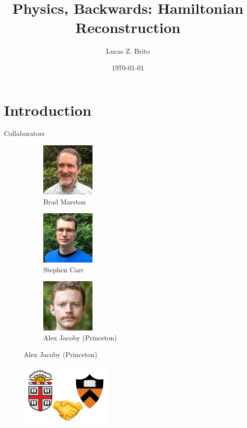 \documentclass{beamer}
\title{Physics, Backwards: Hamiltonian Reconstruction}
\author{Lucas Z. Brito}
\date{\today}
\institute{Brown Physics DUG Scialogue}
\begin{document}
\begin{frame}[plain]
    \titlepage 
\end{frame}

\section{Introduction}
\begin{frame}{Collaborators}
\begin{figure}[t]
\captionsetup[subfigure]{labelformat=empty}
\centering
\begin{subfigure}{0.33\textwidth}
	\centering
	\includegraphics[width=75pt]{figs/marston.jpg}
	\caption{Brad Marston}
\end{subfigure}%
\begin{subfigure}{0.33\textwidth}
	\centering
	\includegraphics[width=75pt]{figs/carr.jpg}
	\caption{Stephen Carr}
\end{subfigure}%
\begin{subfigure}{0.33\textwidth}
	\centering
	\includegraphics[width=75pt]{figs/jacoby.jpg}
	\caption{Alex Jacoby (Princeton)}
\end{subfigure}
\end{figure}
\begin{figure}[h]
	\centering
	\includegraphics[width=0.4\textwidth]{figs/princeton-brown.png}
\end{figure}
\end{frame}
\end{document}
